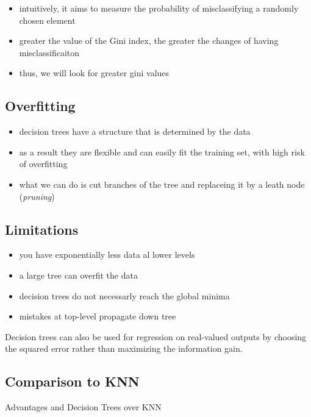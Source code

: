 \documentclass[11pt]{article}
\begin{document}
\begin{itemize}
\tightlist
\item
  intuitively, it aims to measure the probability of misclassifying a
  randomly chosen element
\item
  greater the value of the Gini index, the greater the changes of having
  misclassificaiton
\item
  thus, we will look for greater gini values
\end{itemize}

\subsection{Overfitting}\label{overfitting}

\begin{itemize}
\tightlist
\item
  decision trees have a structure that is determined by the data
\item
  as a result they are flexible and can easily fit the training set,
  with high risk of overfitting
\item
  what we can do is cut branches of the tree and replaceing it by a
  leath node (\emph{pruning})
\end{itemize}

\subsection{Limitations}\label{limitations}

\begin{itemize}
\tightlist
\item
  you have exponentially less data al lower levels
\item
  a large tree can overfit the data
\item
  decision trees do not necessarly reach the global minima
\item
  mistakes at top-level propagate down tree
\end{itemize}

Decision trees can also be used for regression on real-valued outputs by
choosing the squared error rather than maximizing the information gain.

\subsection{Comparison to KNN}\label{comparison-to-knn}

Advantages and Decision Trees over KNN
\end{document}
